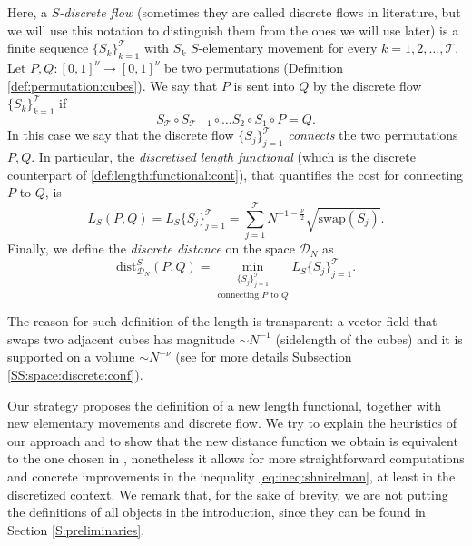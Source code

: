 \documentclass[12 pt]{article}
\theoremstyle{definition} \newtheorem{definition}{Definition}[section]
\theoremstyle{definition} \newtheorem{remark}[definition]{Remark}
\theoremstyle{plain} \newtheorem{lemma}[definition]{Lemma}
\theoremstyle{plain} \newtheorem{proposition}[definition]{Proposition}
\theoremstyle{plain} \newtheorem{theorem}[definition]{Theorem}
\theoremstyle{plain} \newtheorem{corollary}[definition]{Corollary}
\theoremstyle{definition} \newtheorem{example}[definition]{Example}
\theoremstyle{definition} \newtheorem{assumption}[definition]{Assumption}
\theoremstyle{definition} \newtheorem{conjecture}[definition]{Conjecture}
\newcommand{\1}{\mathbbm 1}
\numberwithin{equation}{section}
\begin{document}
 Here, a \emph{$S$-discrete flow}  (sometimes they are called discrete flows in literature, but we will use this notation to distinguish them from the ones we will use later) is a finite sequence $\lbrace S_k\rbrace _{k=1}^\mathcal{T} $ with $S_k$ $S$-elementary movement for every $k=1,2,\dots,\mathcal{T}$. Let $P,Q:[0,1]^\nu\rightarrow [0,1]^\nu$ be two permutations (Definition \ref{def:permutation:cubes}).
  We say that $P$ is sent into $Q$ by the discrete flow $\lbrace S_k\rbrace_{k=1}^\mathcal{T}$ if
\begin{equation*}
    S_\mathcal{T}\circ S_{\mathcal{T}-1}\circ \dots S_2 \circ S_1\circ P=Q.
\end{equation*}
In this case we say that the discrete flow $\lbrace S_j\rbrace_{j=1}^\mathcal{T}$ \emph{connects} the two permutations $P,Q$. 
In particular, the \emph{discretised length functional} (which is the discrete counterpart of \eqref{def:length:functional:cont}), that quantifies the cost for connecting $P$ to $Q$, is
\begin{equation}\label{eq:discr:length}
    L_S(P,Q)=L_S\lbrace{S_j}\rbrace_{j=1}^\mathcal{T}=\sum_{j=1}^{\mathcal{T}} N^{-1-\frac{\nu}{2}}\sqrt{\text{swap}(S_j)}.
\end{equation}
Finally, we define the \emph{discrete distance} on the space $\mathcal{D}_N$ as
\begin{equation}
    \text{dist}^S_{\mathcal{D}_N}(P,Q)=\underset{ \text{connecting } P\text{ to }Q}{\min_{\lbrace S_j\rbrace_{j=1}^{\mathcal{T}} }} L_S\lbrace S_j\rbrace_{j=1}^\mathcal{T}.
\end{equation}

The reason for such definition of the length is transparent: a vector field that swaps two adjacent cubes has magnitude $\sim N^{-1}$ (sidelength of the cubes) and it is supported on a volume $\sim N^{-\nu}$ (see for more details Subsection \ref{SS:space:discrete:conf}). 



Our strategy proposes the definition of a new length functional, together with new elementary movements and discrete flow. We try to explain the heuristics of our approach and to show that the new distance function we obtain is equivalent to the one chosen in \cite{Shnirelman}, nonetheless it allows for more straightforward computations and concrete improvements in the inequality \eqref{eq:ineq:shnirelman}, at least in the discretized context. We remark that, for the sake of brevity, we are not putting the definitions of all objects in the introduction, since they can be found in Section \ref{S:preliminaries}.
\end{document}
